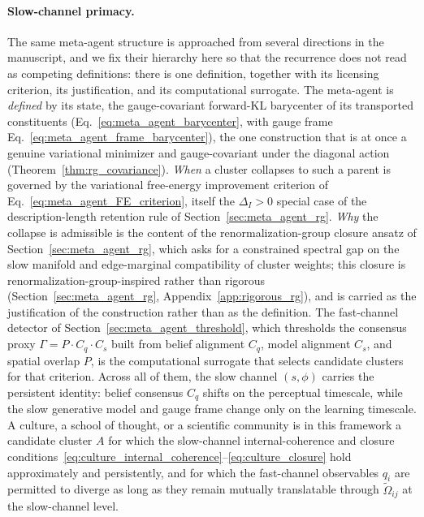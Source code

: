 \documentclass[11pt]{article}
\begin{document}
\paragraph{Slow-channel primacy.}
The same meta-agent structure is approached from several directions in the manuscript, and we fix their hierarchy here so that the recurrence does not read as competing definitions: there is one definition, together with its licensing criterion, its justification, and its computational surrogate. The meta-agent is \emph{defined} by its state, the gauge-covariant forward-KL barycenter of its transported constituents (Eq.~\eqref{eq:meta_agent_barycenter}, with gauge frame Eq.~\eqref{eq:meta_agent_frame_barycenter}), the one construction that is at once a genuine variational minimizer and gauge-covariant under the diagonal action (Theorem~\ref{thm:rg_covariance}). \emph{When} a cluster collapses to such a parent is governed by the variational free-energy improvement criterion of Eq.~\eqref{eq:meta_agent_FE_criterion}, itself the $\Delta_I > 0$ special case of the description-length retention rule of Section~\ref{sec:meta_agent_rg}. \emph{Why} the collapse is admissible is the content of the renormalization-group closure ansatz of Section~\ref{sec:meta_agent_rg}, which asks for a constrained spectral gap on the slow manifold and edge-marginal compatibility of cluster weights; this closure is renormalization-group-inspired rather than rigorous (Section~\ref{sec:meta_agent_rg}, Appendix~\ref{app:rigorous_rg}), and is carried as the justification of the construction rather than as the definition. The fast-channel detector of Section~\ref{sec:meta_agent_threshold}, which thresholds the consensus proxy $\Gamma = P \cdot C_q \cdot C_s$ built from belief alignment $C_q$, model alignment $C_s$, and spatial overlap $P$, is the computational surrogate that selects candidate clusters for that criterion. Across all of them, the slow channel $(s, \phi)$ carries the persistent identity: belief consensus $C_q$ shifts on the perceptual timescale, while the slow generative model and gauge frame change only on the learning timescale. A culture, a school of thought, or a scientific community is in this framework a candidate cluster $A$ for which the slow-channel internal-coherence and closure conditions~\eqref{eq:culture_internal_coherence}--\eqref{eq:culture_closure} hold approximately and persistently, and for which the fast-channel observables $q_i$ are permitted to diverge as long as they remain mutually translatable through $\tilde\Omega_{ij}$ at the slow-channel level.
\end{document}
